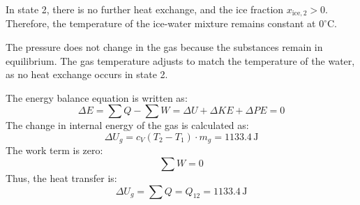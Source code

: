 In state 2, there is no further heat exchange, and the ice fraction \( x_{\text{ice},2} > 0 \). Therefore, the temperature of the ice-water mixture remains constant at \( 0^\circ\text{C} \).  

The pressure does not change in the gas because the substances remain in equilibrium. The gas temperature adjusts to match the temperature of the water, as no heat exchange occurs in state 2.

The energy balance equation is written as:  
\[
\Delta E = \sum Q - \sum W = \Delta U + \Delta KE + \Delta PE = 0
\]  
The change in internal energy of the gas is calculated as:  
\[
\Delta U_g = c_V (T_2 - T_1) \cdot m_g = 1133.4 \, \text{J}
\]  
The work term is zero:  
\[
\sum W = 0
\]  
Thus, the heat transfer is:  
\[
\Delta U_g = \sum Q = Q_{12} = 1133.4 \, \text{J}
\]